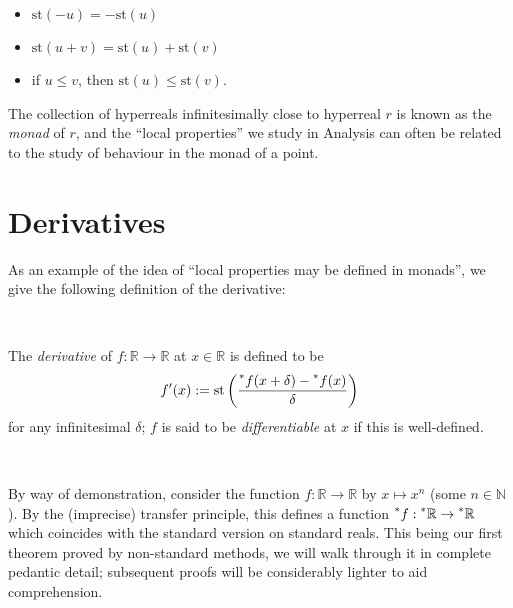 \documentclass[11pt]{amsart}
\theoremstyle{remark}
\newcommand{\st}{\mathrm{st}}
\newcommand{\hyp}[1][\mathbb{R}]{\prescript{*}{}{#1}}
\begin{document}
\begin{itemize}
\item $\st(-u) = - \st(u)$
\item $\st(u+v) = \st(u) + \st(v)$
\item if $u \leq v$, then $\st(u) \leq \st(v)$.
\end{itemize}

The collection of hyperreals infinitesimally close to hyperreal $r$ is known as the \emph{monad} of $r$, and the ``local properties'' we study in Analysis can often be related to the study of behaviour in the monad of a point.

\section{Derivatives}

As an example of the idea of ``local properties may be defined in monads'', we give the following definition of the derivative:

\

\begin{defn} \label{derivative}
The \emph{derivative} of $f: \mathbb{R} \to \mathbb{R}$ at $x \in \mathbb{R}$ is defined to be $$f'(x) := \st \left( \dfrac{\hyp[f](x+\delta)-\hyp[f](x)}{\delta} \right)$$
for any infinitesimal $\delta$; $f$ is said to be \emph{differentiable} at $x$ if this is well-defined.
\end{defn}

\

By way of demonstration, consider the function $f: \mathbb{R} \to \mathbb{R}$ by $x \mapsto x^n$ (some $n \in \mathbb{N}$).
By the (imprecise) transfer principle, this defines a function $\hyp[f]: \hyp \to \hyp$ which coincides with the standard version on standard reals.
This being our first theorem proved by non-standard methods, we will walk through it in complete pedantic detail; subsequent proofs will be considerably lighter to aid comprehension.

\
\end{document}
